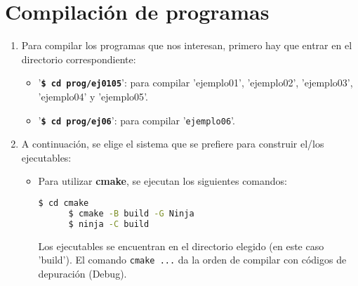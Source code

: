 %

\section{Compilación de programas}\label{sec:compilacion}

\begin{enumerate}
  \item Para compilar los programas que nos interesan, primero hay que entrar en el directorio correspondiente:
\begin{itemize}
  \tightlist
\item '\textbf{\texttt{\$ cd prog/ej0105}}':
  para compilar '\textsf{ejemplo01}', '\textsf{ejemplo02}', '\textsf{ejemplo03}', '\textsf{ejemplo04}'
  y '\textsf{ejemplo05}'.
\item '\textbf{\texttt{\$ cd prog/ej06}}': para compilar '\texttt{ejemplo06}'.
\end{itemize}

\item A continuación, se elige el sistema que se prefiere para construir el/los ejecutables:
  \begin{itemize}
    \tightlist
  \item Para utilizar \textbf{cmake}, se ejecutan los siguientes comandos:
    \begin{lstlisting}[language=bash]
      $ cd cmake
      $ cmake -B build -G Ninja
      $ ninja -C build
    \end{lstlisting}
    Los ejecutables se encuentran en el directorio elegido (en este caso 'build').
    El comando \texttt{cmake ...} da la orden de compilar con códigos de depuración (\textsf{Debug}).


\end{itemize}
\end{enumerate}
